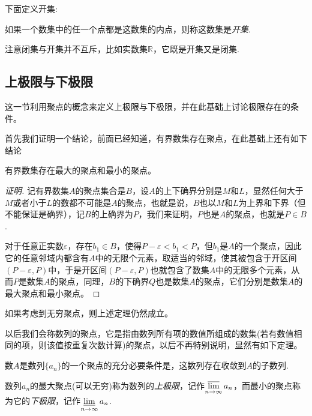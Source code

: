 下面定义开集:
\begin{definition}
  如果一个数集中的任一个点都是这数集的内点，则称这数集是\emph{开集}.
\end{definition}

注意闭集与开集并不互斥，比如实数集$\mathbb{R}$，它既是开集又是闭集.

\subsection{上极限与下极限}
\label{sec:upper-limit-and-lower-limit}

这一节利用聚点的概念来定义上极限与下极限，并在此基础上讨论极限存在的条件。

首先我们证明一个结论，前面已经知道，有界数集存在聚点，在此基础上还有如下结论
\begin{theorem}
  有界数集存在最大的聚点和最小的聚点。
\end{theorem}

\begin{proof}[证明]
  记有界数集$A$的聚点集合是$B$，设$A$的上下确界分别是$M$和$L$，显然任何大于$M$或者小于$L$的数都不可能是$A$的聚点，也就是说，$B$也以$M$和$L$为上界和下界（但不能保证是确界），记$B$的上确界为$P$，我们来证明，$P$也是$A$的聚点，也就是$P \in B$.

  对于任意正实数$\varepsilon$，存在$b_1 \in B$，使得$P-\varepsilon < b_1 < P$，但$b_1$是$A$的一个聚点，因此它的任意邻域内都含有$A$中的无限个元素，取适当的邻域，使其被包含于开区间$(P-\varepsilon,P)$中，于是开区间$(P-\varepsilon,P)$也就包含了数集$A$中的无限多个元素，从而$P$是数集$A$的聚点，同理，$B$的下确界$Q$也是数集$A$的聚点，它们分别是数集$A$的最大聚点和最小聚点。
\end{proof}

如果考虑到无穷聚点，则上述定理仍然成立。

以后我们会称数列的聚点，它是指由数列所有项的数值所组成的数集(若有数值相同的项，则该值按重复次数计算)的聚点，以后不再特别说明，显然有如下定理。

\begin{theorem}
  数$A$是数列$\{a_n\}$的一个聚点的充分必要条件是，这数列存在收敛到$A$的子数列.
\end{theorem}

\begin{definition}
  数列$a_n$的最大聚点(可以无穷)称为数列的\emph{上极限}，记作$\varlimsup\limits_{n \to \infty}a_n$，而最小的聚点称为它的\emph{下极限}，记作$\varliminf\limits_{n \to \infty} a_n$.
\end{definition}

